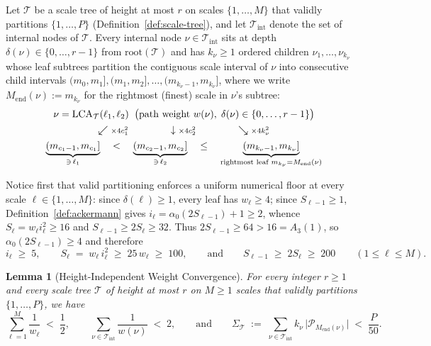 \documentclass[11pt]{article}
\newtheorem{lemma}[theorem]{Lemma}
\theoremstyle{definition}
\theoremstyle{remark}
\newcommand{\LCA}{\mathrm{LCA}}
\begin{document}
Let $\mathcal{T}$ be a scale tree of height at most $r$ on scales $\{1, \dots, M\}$ that validly partitions $\{1, \dots, P\}$ (Definition~\ref{def:scale-tree}), and let $\mathcal{T}_{\mathrm{int}}$ denote the set of internal nodes of $\mathcal{T}$. Every internal node $\nu \in \mathcal{T}_{\mathrm{int}}$ sits at depth $\delta(\nu) \in \{0, \dots, r - 1\}$ from $\mathrm{root}(\mathcal{T})$ and has $k_\nu \ge 1$ ordered children $\nu_1, \dots, \nu_{k_\nu}$ whose leaf subtrees partition the contiguous scale interval of $\nu$ into consecutive child intervals $(m_0, m_1], (m_1, m_2], \dots, (m_{k_\nu - 1}, m_{k_\nu}]$, where we write $M_{\mathrm{end}}(\nu) := m_{k_\nu}$ for the rightmost (finest) scale in $\nu$'s subtree:
\[
\begin{array}{c}
\nu = \LCA_{\mathcal{T}}(\ell_1, \ell_2) \;\; \big(\text{path weight } w(\nu),\; \delta(\nu) \in \{0, \dots, r - 1\}\big)\\[4pt]
\swarrow \text{\scriptsize $\times 4 c_1^2$} \qquad\qquad \downarrow \text{\scriptsize $\times 4 c_2^2$} \qquad\qquad \searrow \text{\scriptsize $\times 4 k_\nu^2$}\\[4pt]
\underbrace{(m_{c_1 - 1}, m_{c_1}]}_{\ni\, \ell_1}
\quad < \quad
\underbrace{(m_{c_2 - 1}, m_{c_2}]}_{\ni\, \ell_2}
\quad \le \quad
\underbrace{(m_{k_\nu - 1}, m_{k_\nu}]}_{\text{rightmost leaf } m_{k_\nu} = M_{\mathrm{end}}(\nu)}
\end{array}
\]

Notice first that valid partitioning enforces a uniform numerical floor at every scale $\ell \in \{1, \dots, M\}$: since $\delta(\ell) \ge 1$, every leaf has $w_\ell \ge 4$; since $S_{\ell-1} \ge 1$, Definition~\ref{def:ackermann} gives $i_\ell = \alpha_0(2 S_{\ell-1}) + 1 \ge 2$, whence $S_\ell = w_\ell i_\ell^2 \ge 16$ and $S_{\ell-1} \ge 2 S_\ell \ge 32$. Thus $2 S_{\ell-1} \ge 64 > 16 = A_3(1)$, so $\alpha_0(2 S_{\ell-1}) \ge 4$ and therefore
\begin{equation}
\label{eq:scale-floor}
i_\ell \;\ge\; 5, \qquad S_\ell \;=\; w_\ell\,i_\ell^2 \;\ge\; 25\,w_\ell \;\ge\; 100, \qquad\text{and}\qquad S_{\ell-1} \;\ge\; 2 S_\ell \;\ge\; 200 \qquad (1 \le \ell \le M).
\end{equation}

\begin{lemma}[Height-Independent Weight Convergence]
\label{lem:tree-weights}
For every integer $r \ge 1$ and every scale tree $\mathcal{T}$ of height at most $r$ on $M \ge 1$ scales that validly partitions $\{1, \dots, P\}$, we have
\[
\sum_{\ell=1}^M \frac{1}{w_\ell} \;<\; \frac{1}{2},
\qquad
\sum_{\nu \in \mathcal{T}_{\mathrm{int}}} \frac{1}{w(\nu)} \;<\; 2,
\qquad\text{and}\qquad
\Sigma_{\mathcal{T}} \;:=\; \sum_{\nu \in \mathcal{T}_{\mathrm{int}}} k_\nu\,\big|\mathcal{P}_{M_{\mathrm{end}}(\nu)}\big| \;<\; \frac{P}{50}.
\]
\end{lemma}
\end{document}
